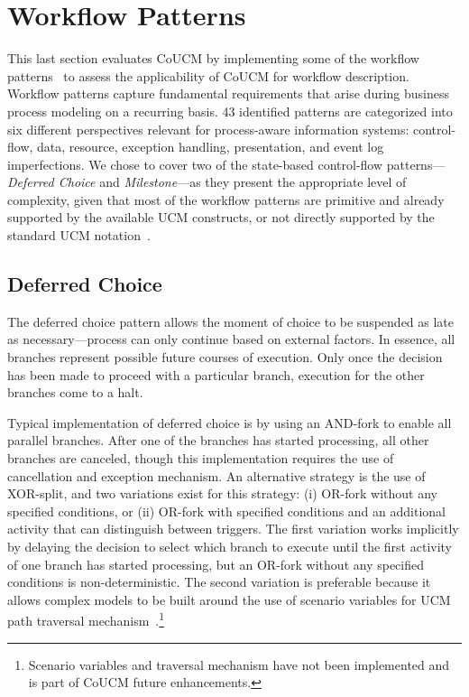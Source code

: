 \section{Workflow Patterns} \label{sec:4.3}

This last section evaluates CoUCM by implementing some of the workflow patterns~\cite{van2003workflow, russell2006workflow} to assess the applicability of CoUCM for workflow description. Workflow patterns capture fundamental requirements that arise during business process modeling on a recurring basis. 43 identified patterns are categorized into six different perspectives relevant for process-aware information systems: control-flow, data, resource, exception handling, presentation, and event log imperfections. We chose to cover two of the state-based control-flow patterns---\emph{Deferred Choice} and \emph{Milestone}---as they present the appropriate level of complexity, given that most of the workflow patterns are primitive and already supported by the available UCM constructs, or not directly supported by the standard UCM notation~\cite{mussbacher2011aspect}.

\subsection{Deferred Choice}

The deferred choice pattern allows the moment of choice to be suspended as late as necessary---process can only continue based on external factors. In essence, all branches represent possible future courses of execution. Only once the decision has been made to proceed with a particular branch, execution for the other branches come to a halt. 

Typical implementation of deferred choice is by using an AND-fork to enable all parallel branches. After one of the branches has started processing, all other branches are canceled, though this implementation requires the use of cancellation and exception mechanism. An alternative strategy is the use of XOR-split, and two variations exist for this strategy: (i) OR-fork without any specified conditions, or (ii) OR-fork with specified conditions and an additional activity that can distinguish between triggers. The first variation works implicitly by delaying the decision to select which branch to execute until the first activity of one branch has started processing, but an OR-fork without any specified conditions is non-deterministic. The second variation is preferable because it allows complex models to be built around the use of scenario variables for UCM path traversal mechanism~\cite{kealey2007enhanced2}.\footnote{Scenario variables and traversal mechanism have not been implemented and is part of CoUCM future enhancements.}

